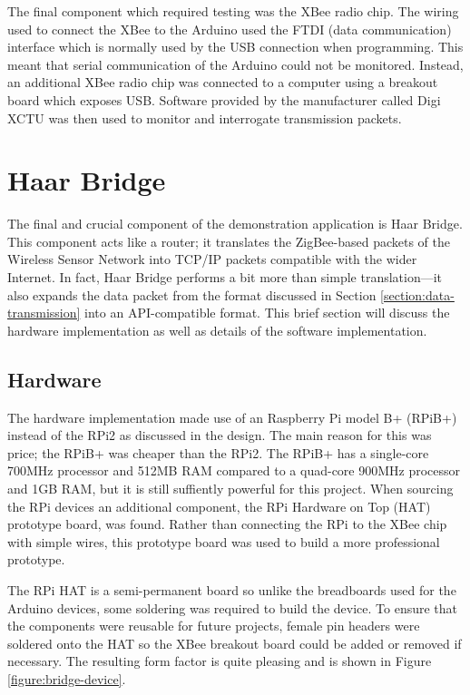       The final component which required testing was the XBee radio chip. The wiring used to connect the XBee to the Arduino used the FTDI (data communication) interface which is normally used by the USB connection when programming. This meant that serial communication of the Arduino could not be monitored. Instead, an additional XBee radio chip was connected to a computer using a breakout board which exposes USB. Software provided by the manufacturer called Digi XCTU was then used to monitor and interrogate transmission packets.   

  \section{Haar Bridge}
    The final and crucial component of the demonstration application is Haar Bridge. This component acts like a router; it translates the ZigBee-based packets of the Wireless Sensor Network into TCP/IP packets compatible with the wider Internet. In fact, Haar Bridge performs a bit more than simple translation---it also expands the data packet from the format discussed in Section \ref{section:data-transmission} into an API-compatible format. This brief section will discuss the hardware implementation as well as details of the software implementation.

    \subsection{Hardware}
      The hardware implementation made use of an Raspberry Pi model B+ (RPiB+) instead of the RPi2 as discussed in the design. The main reason for this was price; the RPiB+ was cheaper than the RPi2. The RPiB+ has a single-core 700MHz processor and 512MB RAM compared to a quad-core 900MHz processor and 1GB RAM, but it is still suffiently powerful for this project. When sourcing the RPi devices an additional component, the RPi Hardware on Top (HAT) prototype board, was found. Rather than connecting the RPi to the XBee chip with simple wires, this prototype board was used to build a more professional prototype.

      The RPi HAT is a semi-permanent board so unlike the breadboards used for the Arduino devices, some soldering was required to build the device. To ensure that the components were reusable for future projects, female pin headers were soldered onto the HAT so the XBee breakout board could be added or removed if necessary. The resulting form factor is quite pleasing and is shown in Figure \ref{figure:bridge-device}.

